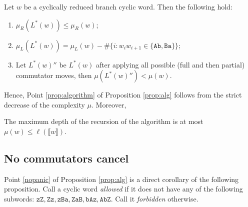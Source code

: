 \documentclass{article}
\begin{document}
	\begin{proposition}
		Let $w$ be a cyclically reduced branch cyclic word.
		Then the following hold:
		\begin{enumerate}
			\item $\mu_R(L^*(w))\le\mu_R(w)$;
			\item $\mu_L(L^*(w))=\mu_L(w)-\#\{i:w_iw_{i+1}\in\{\mathtt{A b},\mathtt{B a}\}\}$;
			\item Let $L^*(w)''$ be $L^*(w)$ after applying all possible (full and then partial) commutator moves, then $\mu(L^*(w)'')<\mu(w)$.
		\end{enumerate}
	\end{proposition}
	
	Hence, Point \ref{prop:algorithm} of Proposition \ref{prop:alg} follows from the strict decrease of the complexity $\mu$. Moreover,
	
	\begin{corollary}
		The maximum depth of the recursion of the algorithm is at most $\mu(w)\le\ell(\llbracket w \rrbracket)$.
	\end{corollary}
	
	\subsection{No commutators cancel}
	
	Point \ref{nopanic} of Proposition \ref{prop:alg} is a direct corollary of the following proposition. Call a cyclic word \emph{allowed} if it does not have any of the following subwords: $\mathtt{zZ},\mathtt{Z z},\mathtt{zB a},\mathtt{Z aB}, \mathtt{bA z},\mathtt{A bZ}$. Call it \emph{forbidden} otherwise.
	
\end{document}
